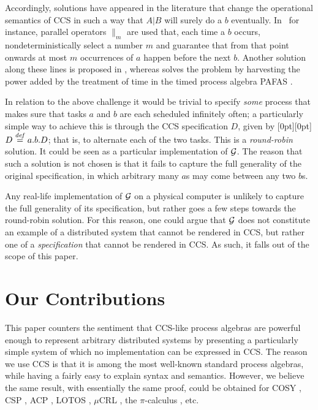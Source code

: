 \documentclass[smallcondensed]{svjour3}
\newcommand{\plat}[1]{\raisebox{0pt}[0pt][0pt]{#1}}  \def\precond#1{{\vphantom{#1}}^\bullet #1}
\newcounter {part}
\begin{document}
Accordingly, solutions have appeared in the literature that change the operational semantics of CCS
in such a way that $A|B$ will surely do a $b$ eventually. In~\cite{Plotkin82} for instance,
parallel operators $\|_m$ are used that, each time a $b$ occurs, nondeterministically select a
number $m$ and guarantee that from that point onwards at most $m$ occurrences of $a$ happen
before the next $b$. Another solution along these lines is proposed in \cite{CS84}, whereas
\cite{CBV06} solves the problem by harvesting the power added by the treatment of time in the timed
process algebra PAFAS \cite{CVJ02}.

In relation to the above challenge it would be trivial to specify \emph{some} process that makes
sure that tasks $a$ and $b$ are each scheduled infinitely often; a particularly simple way to
achieve this is through the CCS specification $D$,\vspace{2pt} given by
\plat{$D \stackrel{{\it def}}{=} a.b.D$}; that is, to alternate each of the two tasks.
This is a \emph{round-robin} solution.
It could be seen as a particular implementation of $\cal G$.
The reason that such a solution is not chosen is that it fails to capture the full generality of
the original specification, in which arbitrary many $a$s may come between any two $b$s.

Any real-life implementation of $\cal G$ on a physical computer is unlikely to capture the full
generality of its specification, but rather goes a few steps towards the round-robin solution.
For this reason, one could argue that $\cal G$ does not constitute an example of a distributed system
that cannot be rendered in CCS, but rather one of a \emph{specification} that
cannot be rendered in CCS\@. As such, it falls out of the scope of this paper.

\section{Our Contributions}\label{ssec:contribution}


This paper counters the sentiment that CCS-like process algebras are powerful
enough to represent arbitrary distributed systems by presenting a particularly simple system of which no
implementation can be expressed in CCS. 
The reason we use CCS is that it is among the most well-known standard process algebras, while having a fairly easy to explain
syntax and semantics. However, we believe the same result, with
essentially the same proof, could be obtained for COSY \cite{LTS79}, CSP \cite{BHR84,Ho85},
ACP \cite{BK86}, LOTOS \cite{BB87}, $\mu$CRL \cite{GP95}, the $\pi$-calculus \cite{MPW92}, etc.
\end{document}

